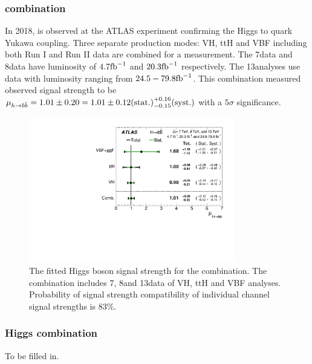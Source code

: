 
\subsubsection{\Hbb combination}
\label{sec:vbf-hbbcomb}

In 2018, \Hbb is observed at the ATLAS experiment \cite{VHPaper} confirming the Higgs to quark Yukawa coupling. Three separate \Hbb production modes: VH, ttH and VBF including both Run I and Run II data are combined for a measurement. The 7\TeV data and 8\TeV data have luminosity of $4.7\rm{fb}^{-1}$ and $20.3\rm{fb}^{-1}$ respectively. The 13\TeV analyses use data with luminosity ranging from $24.5-79.8\rm{fb}^{-1}$. This combination measured observed signal strength to be $\mu_{h \rightarrow b\bar{b}}= 1.01 \pm 0.20 = 1.01 \pm 0.12\text{(stat.)}^{+0.16}_{-0.15}\text{(syst.)}$ with a $5\sigma$ significance.


\begin{figure}[htbp]
  \centering
 \includegraphics[width=0.8\textwidth]{figures/VBF/HbbComb.pdf}
 \caption{The fitted Higgs boson signal strength for the \Hbb combination. The combination includes 7\TeV, 8\TeV and 13\TeV data of VH, ttH and VBF analyses. Probability of signal strength compatibility of individual channel signal strengths is 83\%.}
  \label{fig:vbf-combination-hbb}
\end{figure}



\subsubsection{Higgs combination}
\label{sec:vbf-higgscomb}
 To be filled in.
